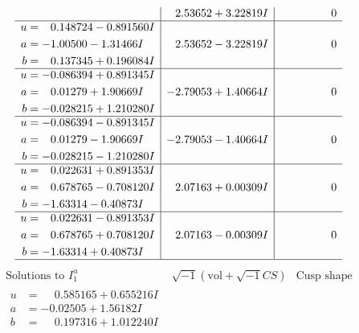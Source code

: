 \documentclass[1p]{elsarticle_modified}
\theoremstyle{definition}
\newcommand{\I}{\sqrt{-1}}
\begin{document}
$$\begin{array}{c|c|c}
 & \phantom{-}2.53652 + 3.22819 I & \phantom{-0.000000 } 0 \\ \hline\begin{aligned}
u &= \phantom{-}0.148724 - 0.891560 I \\
a &= -1.00500 - 1.31466 I \\
b &= \phantom{-}0.137345 + 0.196084 I\end{aligned}
 & \phantom{-}2.53652 - 3.22819 I & \phantom{-0.000000 } 0 \\ \hline\begin{aligned}
u &= -0.086394 + 0.891345 I \\
a &= \phantom{-}0.01279 + 1.90669 I \\
b &= -0.028215 + 1.210280 I\end{aligned}
 & -2.79053 + 1.40664 I & \phantom{-0.000000 } 0 \\ \hline\begin{aligned}
u &= -0.086394 - 0.891345 I \\
a &= \phantom{-}0.01279 - 1.90669 I \\
b &= -0.028215 - 1.210280 I\end{aligned}
 & -2.79053 - 1.40664 I & \phantom{-0.000000 } 0 \\ \hline\begin{aligned}
u &= \phantom{-}0.022631 + 0.891353 I \\
a &= \phantom{-}0.678765 - 0.708120 I \\
b &= -1.63314 - 0.40873 I\end{aligned}
 & \phantom{-}2.07163 + 0.00309 I & \phantom{-0.000000 } 0 \\ \hline\begin{aligned}
u &= \phantom{-}0.022631 - 0.891353 I \\
a &= \phantom{-}0.678765 + 0.708120 I \\
b &= -1.63314 + 0.40873 I\end{aligned}
 & \phantom{-}2.07163 - 0.00309 I & \phantom{-0.000000 } 0\\
 \hline 
 \end{array}$$\newpage$$\begin{array}{c|c|c}  
\text{Solutions to }I^u_{1}& \I (\text{vol} + \sqrt{-1}CS) & \text{Cusp shape}\\
 \hline 
\begin{aligned}
u &= \phantom{-}0.585165 + 0.655216 I \\
a &= -0.02505 + 1.56182 I \\
b &= \phantom{-}0.197316 + 1.012240 I\end{aligned}

\end{array}$$
\end{document}
